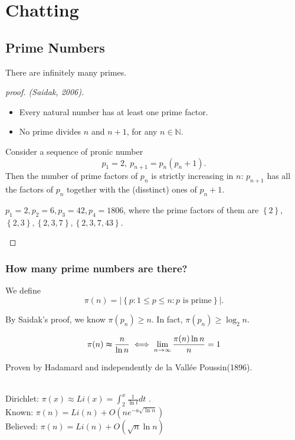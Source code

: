 \chapter{Chatting}
\section{Prime Numbers}
\begin{theorem}
  There are infinitely many primes.
\end{theorem}
\begin{proof}[proof. (Saidak, 2006)]
\vphantom{ }
\begin{itemize}
  \item Every natural number has at least one prime factor.
  \item No prime divides \(n\) and \(n+1\), for any \(n \in \mathbb{N} \).   
\end{itemize}
Consider a sequence of pronic number 
\[
  p_1 = 2, \ p_{n+1} = p_n(p_n + 1).
\]
Then the number of prime factors of \(p_n\) is strictly increasing in \(n\): \(p_{n+1}\) has all the factors of \(p_n\) together with the (disstinct) ones of \(p_n + 1\). 
\begin{eg}
  \(p_1=2, p_2=6, p_3=42,p_4=1806 \), where the prime factors of them are \(\left\{ 2 \right\}\), \(\left\{ 2,3 \right\}, \left\{ 2,3,7 \right\}, \left\{ 2,3,7,43 \right\} \).
\end{eg}     
\end{proof}

\subsection{How many prime numbers are there?}
\begin{definition}
  We define 
  \[
    \pi (n) = \left\vert \left\{ p: 1 \le p \le n : p \text{ is prime}\right\}  \right\vert. 
  \]
\end{definition}
\begin{note}
  By Saidak's proof, we know \(\pi (p_n) \ge n\). In fact, \(\pi (p_n) \ge \log _2 n\). 
\end{note}
\begin{theorem}
  \[
    \pi (n) \thickapprox \frac{n}{\ln n} \iff \lim_{n \to \infty} \frac{\pi (n) \ln n}{n} = 1 
  \]
\end{theorem}
\begin{note}
  Proven by Hadamard and independently de la Vallée Poussin(1896).
\end{note}
\begin{theorem}
  \vphantom{text} \\
  Dirichlet: \(\pi (x) \approx Li(x) = \int_2^x \frac{1}{\ln t} dt\) . \\ 
  Known: \(\pi (n) = Li(n) + O\left( n e^{-a \sqrt{\ln n} } \right) \) \\
  Believed: \(\pi (n) = Li(n) + O\left( \sqrt{n} \ln n  \right) \)  
\end{theorem}

